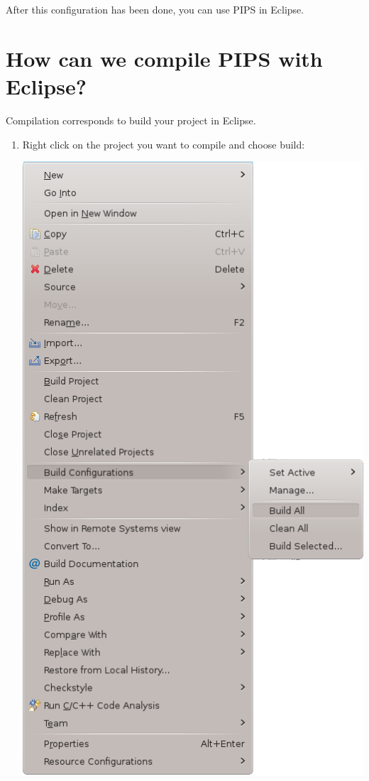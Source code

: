 \documentclass[a4paper]{article}
\begin{document}
After this configuration has been done, you can use PIPS in Eclipse.

\newpage

\section{How can we compile PIPS with Eclipse?}

Compilation corresponds to build your project in Eclipse.

\begin{enumerate}
\item Right click on the project you want to compile and choose build:
\begin{center}
\noindent
\includegraphics[scale=0.4]{eclipse/06-eclipseJUNO-build1.png}
\end{center}


\end{enumerate}
\end{document}
